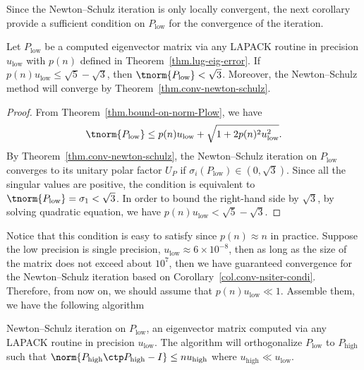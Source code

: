 \documentclass{article}
\numberwithin{equation}{section} %
\begin{document}

Since the Newton--Schulz iteration is only locally convergent, the next corollary
provide a sufficient condition on $P_{\mathrm{low}}$ for the convergence of the
iteration.

\begin{corollary}
\label{col.conv-nsiter-condi}
Let $P_{\mathrm{low}}$ be a computed eigenvector matrix via any LAPACK routine
in precision $u_{\mathrm{low}}$ with $p(n)$ defined in
Theorem~\ref{thm.lug-eig-error}. If $p(n)u_{\mathrm{low}} \le \sqrt{5} -
\sqrt{3}$, then $\tnorm{P_{\mathrm{low}}} < \sqrt{3}$. Moreover, the
Newton--Schulz method will converge by Theorem~\ref{thm.conv-newton-schulz}. 
\end{corollary}
\begin{proof}
From Theorem~\ref{thm.bound-on-norm-Plow}, we have
\begin{equation}\notag
  \tnorm{P_{\mathrm{low}}} \le
  p(n)u_{\mathrm{low}} + \sqrt{1 + 2p(n)^{2}u_{\mathrm{low}}^{2}}.
\end{equation}
By Theorem~\ref{thm.conv-newton-schulz}, the Newton--Schulz iteration on
$P_{\mathrm{low}}$ converges to its unitary polar factor $U_{P}$ if
$\sigma_{i}(P_{\mathrm{low}}) \in (0,\sqrt{3})$. Since all the singular values
are positive, the condition is equivalent to $\tnorm{P_{\mathrm{low}}} =
\sigma_{1} < \sqrt{3}$. In order to bound the right-hand side by $\sqrt{3}$,
by solving quadratic equation, we have $p(n) u_{\mathrm{low}} < \sqrt{5}
- \sqrt{3}$. 
\end{proof}

Notice that this condition is easy to satisfy since $p(n) \approx n$ in  
practice.  
Suppose the low precision is single precision,
$u_{\mathrm{low}} \approx 6 \times 10^{-8}$, then as long as the size
of the matrix does not exceed about $10^{7}$, then we have guaranteed
convergence for the Newton--Schulz iteration based on
Corollary~\ref{col.conv-nsiter-condi}.
Therefore, from now on, we should assume that $p(n)u_{\mathrm{low}} \ll 1$.
Assemble them, we have the following algorithm
\begin{algorithm}
\caption{Newton--Schulz iteration on $P_{\mathrm{low}}$, an
  eigenvector matrix computed via any LAPACK routine in precision
  $u_{\mathrm{low}}$.
  The algorithm will orthogonalize $P_{\mathrm{low}}$
  to $P_{\mathrm{high}}$ such that
  $\norm{P_{\mathrm{high}}\ctp P_{\mathrm{high}}- I} \le nu_{\mathrm{high}}$
  where  $u_{\mathrm{high}} \ll u_{\mathrm{low}}$.} 
\label{alg.ns-iter-orthogonal}
\begin{algorithmic}[1]
\EndIf
{}
\EndFor
\end{algorithmic}
\end{algorithm}
\end{document}
